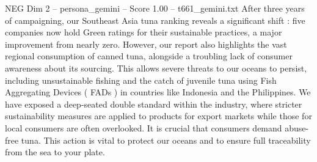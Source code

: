 \begin{textsample}{NEG Dim 2 – persona\_gemini – Score 1.00 – t661\_gemini.txt}  \label{ex:f2_neg_014}
After three years of campaigning, our Southeast Asia tuna ranking reveals a significant shift : five companies now hold Green ratings for their sustainable practices, a major improvement from nearly zero.
However, our report also highlights the vast regional consumption of canned tuna, alongside a troubling lack of consumer awareness about its sourcing.
This allows severe threats to our oceans to persist, including unsustainable fishing and the catch of juvenile tuna using Fish Aggregating Devices ( FADs ) in countries like Indonesia and the Philippines.
We have exposed a deep-seated double standard within the industry, where stricter sustainability measures are applied to products for export markets while those for local consumers are often overlooked.
It is crucial that consumers demand abuse-free tuna.
This action is vital to protect our oceans and to ensure full traceability from the sea to your plate.

\end{textsample}
